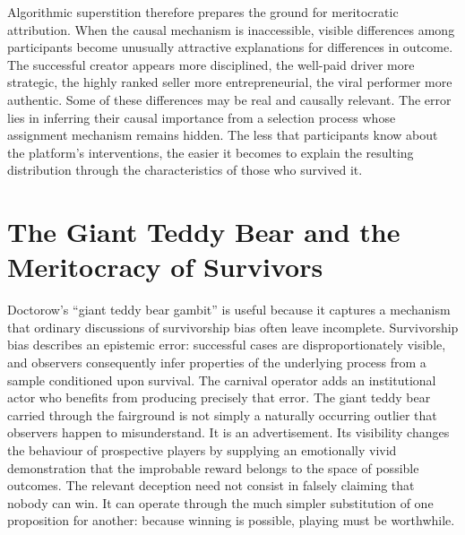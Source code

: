 \documentclass[11pt]{article}
\begin{document}
Algorithmic superstition therefore prepares the ground for meritocratic attribution. When the causal mechanism is inaccessible, visible differences among participants become unusually attractive explanations for differences in outcome. The successful creator appears more disciplined, the well-paid driver more strategic, the highly ranked seller more entrepreneurial, the viral performer more authentic. Some of these differences may be real and causally relevant. The error lies in inferring their causal importance from a selection process whose assignment mechanism remains hidden. The less that participants know about the platform's interventions, the easier it becomes to explain the resulting distribution through the characteristics of those who survived it.

\section{The Giant Teddy Bear and the Meritocracy of Survivors}

Doctorow's ``giant teddy bear gambit'' is useful because it captures a mechanism that ordinary discussions of survivorship bias often leave incomplete. Survivorship bias describes an epistemic error: successful cases are disproportionately visible, and observers consequently infer properties of the underlying process from a sample conditioned upon survival. The carnival operator adds an institutional actor who benefits from producing precisely that error. The giant teddy bear carried through the fairground is not simply a naturally occurring outlier that observers happen to misunderstand. It is an advertisement. Its visibility changes the behaviour of prospective players by supplying an emotionally vivid demonstration that the improbable reward belongs to the space of possible outcomes. The relevant deception need not consist in falsely claiming that nobody can win. It can operate through the much simpler substitution of one proposition for another: because winning is possible, playing must be worthwhile.
\end{document}

